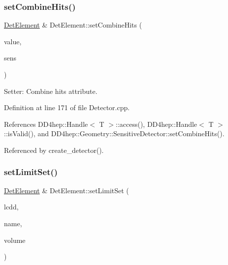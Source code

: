 \subsubsection{\texorpdfstring{set\+Combine\+Hits()}{setCombineHits()}}
{\footnotesize\ttfamily \hyperlink{class_d_d4hep_1_1_geometry_1_1_det_element}{Det\+Element} \& Det\+Element\+::set\+Combine\+Hits (\begin{DoxyParamCaption}\item[{bool}]{value,  }\item[{\hyperlink{class_d_d4hep_1_1_geometry_1_1_sensitive_detector}{Sensitive\+Detector} \&}]{sens }\end{DoxyParamCaption})}



Setter\+: Combine hits attribute. 



Definition at line 171 of file Detector.\+cpp.



References D\+D4hep\+::\+Handle$<$ T $>$\+::access(), D\+D4hep\+::\+Handle$<$ T $>$\+::is\+Valid(), and D\+D4hep\+::\+Geometry\+::\+Sensitive\+Detector\+::set\+Combine\+Hits().



Referenced by create\+\_\+detector().

\hypertarget{class_d_d4hep_1_1_geometry_1_1_det_element_ad17fa6f9605dc731cf376b477bd794ff}{}\label{class_d_d4hep_1_1_geometry_1_1_det_element_ad17fa6f9605dc731cf376b477bd794ff} 
\subsubsection{\texorpdfstring{set\+Limit\+Set()}{setLimitSet()}}
{\footnotesize\ttfamily \hyperlink{class_d_d4hep_1_1_geometry_1_1_det_element}{Det\+Element} \& Det\+Element\+::set\+Limit\+Set (\begin{DoxyParamCaption}\item[{const \hyperlink{class_d_d4hep_1_1_geometry_1_1_l_c_d_d}{L\+C\+DD} \&}]{lcdd,  }\item[{const std\+::string \&}]{name,  }\item[{const \hyperlink{class_d_d4hep_1_1_geometry_1_1_volume}{Volume} \&}]{volume }\end{DoxyParamCaption})}



